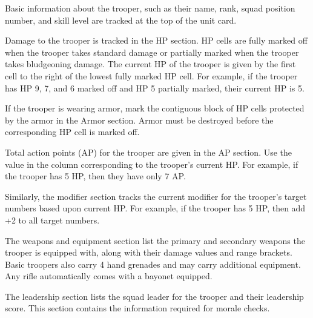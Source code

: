 Basic information about the trooper, such as their name, rank, squad position number, and skill level are tracked at the top of the unit card.

Damage to the trooper is tracked in the HP section.
HP cells are fully marked off when the trooper takes standard damage or partially marked when the trooper takes bludgeoning damage.
The current HP of the trooper is given by the first cell to the right of the lowest fully marked HP cell.
For example, if the trooper has HP 9, 7, and 6 marked off and HP 5 partially marked, their current HP is 5.

If the trooper is wearing armor, mark the contiguous block of HP cells protected by the armor in the Armor section.
Armor must be destroyed before the corresponding HP cell is marked off.

Total action points (AP) for the trooper are given in the AP section.
Use the value in the column corresponding to the trooper's current HP.
For example, if the trooper has 5 HP, then they have only 7 AP.

Similarly, the modifier section tracks the current modifier for the trooper's target numbers based upon current HP.
For example, if the trooper has 5 HP, then add +2 to all target numbers.

The weapons and equipment section list the primary and secondary weapons the trooper is equipped with, along with their damage values and range brackets.
Basic troopers also carry 4 hand grenades and may carry additional equipment.
Any rifle automatically comes with a bayonet equipped.

The leadership section lists the squad leader for the trooper and their leadership score.
This section contains the information required for morale checks.
